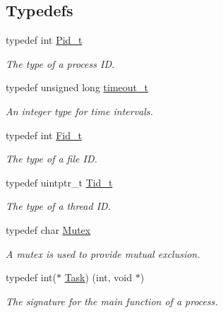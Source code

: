 \subsection*{Typedefs}
\begin{DoxyCompactItemize}
\item 
\mbox{\label{group__syscalls_gafac07f3170763932fac97b6eab2c3984}} 
typedef int \hyperlink{group__syscalls_gafac07f3170763932fac97b6eab2c3984}{Pid\+\_\+t}
\begin{DoxyCompactList}\small\item\em The type of a process ID. \end{DoxyCompactList}\item 
typedef unsigned long \hyperlink{group__syscalls_gaf412159e5cef839836a5e7b19ee75d1c}{timeout\+\_\+t}
\begin{DoxyCompactList}\small\item\em An integer type for time intervals. \end{DoxyCompactList}\item 
\mbox{\label{group__syscalls_ga5097222c5f0da97d92d4712359abc38f}} 
typedef int \hyperlink{group__syscalls_ga5097222c5f0da97d92d4712359abc38f}{Fid\+\_\+t}
\begin{DoxyCompactList}\small\item\em The type of a file ID. \end{DoxyCompactList}\item 
\mbox{\label{group__syscalls_gaf67ad1c55e6b2a79bf8a99106380ce01}} 
typedef uintptr\+\_\+t \hyperlink{group__syscalls_gaf67ad1c55e6b2a79bf8a99106380ce01}{Tid\+\_\+t}
\begin{DoxyCompactList}\small\item\em The type of a thread ID. \end{DoxyCompactList}\item 
typedef char \hyperlink{group__syscalls_gaef2ec62cae8e0031fd19fc8b91083ade}{Mutex}
\begin{DoxyCompactList}\small\item\em A mutex is used to provide mutual exclusion. \end{DoxyCompactList}\item 
typedef int($\ast$ \hyperlink{group__syscalls_gaec3f2f835e105271fbbc00272c0ba984}{Task}) (int, void $\ast$)
\begin{DoxyCompactList}\small\item\em The signature for the main function of a process. \end{DoxyCompactList}\item 

\end{DoxyCompactItemize}

